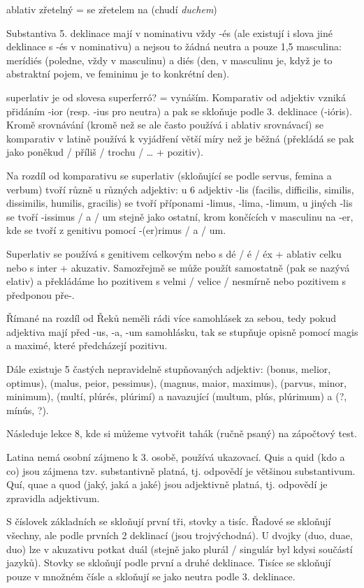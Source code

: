 \documentclass[12pt]{article}					%
\begin{document}
ablativ zřetelný = se zřetelem na (chudí \emph{duchem})

Substantiva 5. deklinace mají v nominativu vždy -és (ale existují i slova jiné deklinace s -és v nominativu) a nejsou to žádná neutra a pouze 1,5 masculina: merídiés (poledne, vždy v masculinu) a diés (den, v masculinu je, když je to abstraktní pojem, ve feminimu je to konkrétní den).

superlativ je od slovesa superferró? = vynáším. Komparativ od adjektiv vzniká přidáním -ior (resp. -ius pro neutra) a pak se skloňuje podle 3. deklinace (-ióris). Kromě srovnávání (kromě než se ale často používá i ablativ srovnávací) se komparativ v latině používá k vyjádření větší míry než je běžná (překládá se pak jako poněkud / příliš / trochu / … + pozitiv).

Na rozdíl od komparativu se superlativ (skloňující se podle servus, femina a verbum) tvoří různě u různých adjektiv: u 6 adjektiv -lis (facilis, difficilis, similis, dissimilis, humilis, gracilis) se tvoří příponami -limus, -lima, -limum, u jiných -lis se tvoří -issimus / a / um stejně jako ostatní, krom končících v masculinu na -er, kde se tvoří z genitivu pomocí -(er)rimus / a / um.

Superlativ se používá s genitivem celkovým nebo s dé / é / éx + ablativ celku nebo s inter + akuzativ. Samozřejmě se může použít samostatně (pak se nazývá elativ) a překládáme ho pozitivem s velmi / velice / nesmírně nebo pozitivem s předponou pře-.

Římané na rozdíl od Řeků neměli rádi více samohlásek za sebou, tedy pokud adjektiva mají před -us, -a, -um samohlásku, tak se stupňuje opisně pomocí magis a maximé, které předcházejí pozitivu.

Dále existuje 5 častých nepravidelně stupňovaných adjektiv: (bonus, melior, optimus), (malus, peior, pessimus), (magnus, maior, maximus), (parvus, minor, minimum), (multí, plúrés, plúrimí) a navazující (multum, plús, plúrimum) a (?, mínús, ?).

Následuje lekce 8, kde si můžeme vytvořit tahák (ručně psaný) na zápočtový test.

Latina nemá osobní zájmeno k 3. osobě, používá ukazovací. Quis a quid (kdo a co) jsou zájmena tzv. substantivně platná, tj. odpovědí je většinou substantivum. Quí, quae a quod (jaký, jaká a jaké) jsou adjektivně platná, tj. odpovědí je zpravidla adjektivum.

S číslovek základních se skloňují první tři, stovky a tisíc. Řadové se skloňují všechny, ale podle prvních 2 deklinací (jsou trojvýchodná). U dvojky (duo, duae, duo) lze v akuzativu potkat duál (stejně jako plurál / singulár byl kdysi součástí jazyků). Stovky se skloňují podle první a druhé deklinace. Tisíce se skloňují pouze v množném čísle a skloňují se jako neutra podle 3. deklinace.
\end{document}
